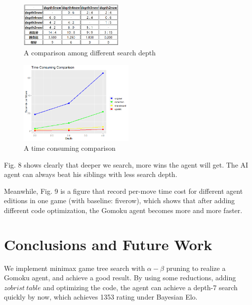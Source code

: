 \documentclass[final]{cvpr}
\begin{document}
\begin{figure}[h]
\centering 
\includegraphics[width=0.45\textwidth]{figures/pic8.png} 
\caption{A comparison among different search depth } 
\label{Fig.main1} %
\end{figure}
\begin{figure}[h]
\centering 
\includegraphics[width=0.5\textwidth]{figures/pic9.png} 
\caption{A time consuming comparison} 
\label{Fig.main1} %
\end{figure}



\par Fig. 8 shows clearly that deeper we search, more wins the agent will get. The AI agent can always beat his siblings with less search depth.

\par Meanwhile, Fig. 9 is a figure that record per-move time cost for different agent editions in one game (with baseline: fiverow), which shows that after adding different code optimization, the Gomoku agent becomes more and more faster.




\section{Conclusions and Future Work}\label{sec:Conclusion}

We implement minimax game tree search with $\alpha-\beta$ pruning to realize a Gomoku agent, and achieve a good result.
%
By using some reductions, adding $zobrist\ table$ and optimizing the code, the agent can achieve a depth-7 search quickly by now, which achieves 1353 rating under Bayesian Elo.
\end{document}

